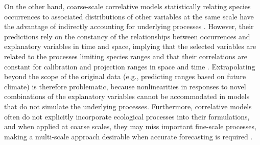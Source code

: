 On the other hand, coarse-scale correlative models statistically relating species occurrences to associated distributions of other variables at the same scale have the advantage of indirectly accounting for underlying processes \citep{Guisan2000}.
However, their predictions rely on the constancy of the relationships between occurrences and explanatory variables in time and space, implying that the selected variables are related to the processes limiting species ranges and that their correlations are constant for calibration and projection ranges in space and time \citep{Dormann2007}. 
Extrapolating beyond the scope of the original data (e.g., predicting ranges based on future climate) is therefore problematic, because nonlinearities in responses to novel combinations of the explanatory variables cannot be accommodated in models that do not simulate the underlying processes.
Furthermore, correlative models often do not explicitly incorporate ecological processes into their formulations, and when applied at coarse scales, they may miss important fine-scale processes, making a multi-scale approach desirable when accurate forecasting is required \citep{Austin2007, Austin2011, Soranno2014}.

